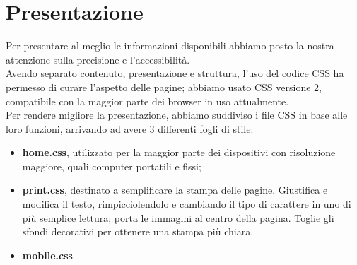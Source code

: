 \section{Presentazione}{
	Per presentare al meglio le informazioni disponibili abbiamo posto la nostra attenzione sulla precisione e l'accessibilità.\\
	Avendo separato contenuto, presentazione e struttura, l'uso del codice CSS ha permesso di curare l'aspetto delle pagine; abbiamo usato CSS versione 2, compatibile con la maggior parte dei browser in uso attualmente.\\
	Per rendere migliore la presentazione, abbiamo suddiviso i file CSS in base alle loro funzioni, arrivando ad avere 3 differenti fogli di stile:
	\begin{itemize}
		\item \textbf{home.css}, utilizzato per la maggior parte dei dispositivi con risoluzione maggiore, quali computer portatili e fissi;
		\item \textbf{print.css}, destinato a semplificare la stampa delle pagine.
		Giustifica e modifica il testo, rimpicciolendolo e cambiando il tipo di carattere in uno di più semplice lettura; porta le immagini al centro della pagina. Toglie gli sfondi decorativi per ottenere una stampa più chiara.
		
		\item \textbf{mobile.css}
	\end{itemize}
}